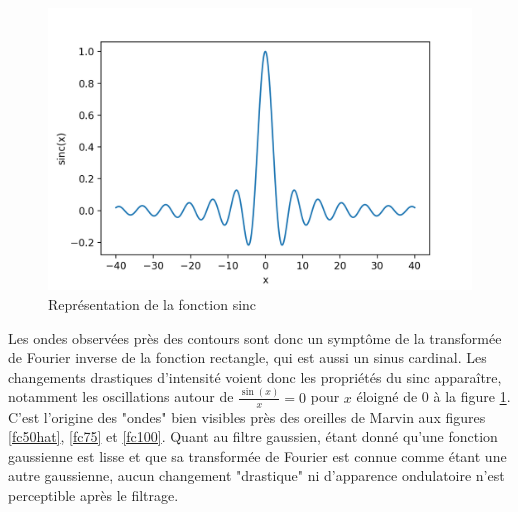 \documentclass[11pt,letterpaper]{article}
\begin{document}
\begin{figure}[H]
  \centering
  \includegraphics[scale=0.7]{sinc.png}
  \caption{Représentation de la fonction sinc}
  \label{sinc}
\end{figure}

Les ondes observées près des contours sont donc un symptôme de la transformée de Fourier inverse de la fonction rectangle, qui est aussi un sinus cardinal. Les changements drastiques d'intensité voient donc les propriétés du sinc apparaître, notamment les oscillations autour de $\frac{\sin\left( x \right)}{x}  = 0$ pour $x$ éloigné de 0 à la figure \ref{sinc}. C'est l'origine des "ondes" bien visibles près des oreilles de Marvin aux figures \ref{fc50hat}, \ref{fc75} et \ref{fc100}. Quant au filtre gaussien, étant donné qu'une fonction gaussienne est lisse et que sa transformée de Fourier est connue comme étant une autre gaussienne, aucun changement "drastique" ni d'apparence ondulatoire n'est perceptible après le filtrage.

\clearpage

% 
% 
\end{document}

